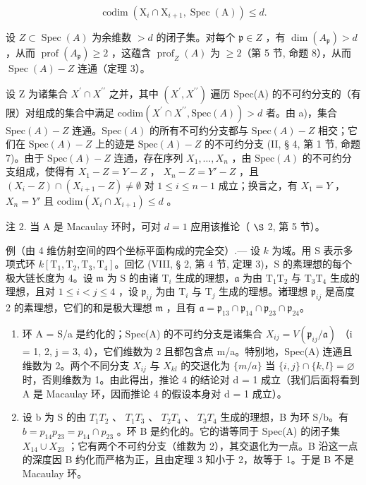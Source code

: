 \[
\operatorname{codim} \left(\mathrm{X} _ {i} \cap \mathrm{X} _ {i + 1}, \operatorname{Spec} (\mathrm{A})\right) \leqslant d.
\]

设 \(Z \subset \operatorname{Spec}(A)\) 为余维数 \(>d\) 的闭子集。对每个 \(\mathfrak{p} \in Z\) ，有 \(\dim(A_{\mathfrak{p}}) > d\) ，从而 \(\operatorname{prof}(A_{\mathfrak{p}}) \geqslant 2\) ，这蕴含 \(\operatorname{prof}_{Z}(A)\) 为 \(\geqslant 2\)（第 5 节, 命题 8），从而 \(\operatorname{Spec}(A) - Z\) 连通（定理 3）。

设 Z 为诸集合 \(X^{\prime} \cap X^{\prime\prime}\) 之并，其中 \((X^{\prime}, X^{\prime\prime})\) 遍历 Spec(A) 的不可约分支的（有限）对组成的集合中满足 \(\text{codim}(X^{\prime} \cap X^{\prime\prime}, \text{Spec}(A)) > d\) 者。由 a)，集合 \(\text{Spec}(A) - Z\) 连通。\(\text{Spec}(A)\) 的所有不可约分支都与 \(\text{Spec}(A) - Z\) 相交；它们在 \(\text{Spec}(A) - Z\) 上的迹是 \(\text{Spec}(A) - Z\) 的不可约分支 (II, § 4, 第 1 节, 命题 7)。由于 \(\text{Spec}(A) - Z\) 连通，存在序列 \(X_{1}, \ldots, X_{n}\) ，由 \(\text{Spec}(A)\) 的不可约分支组成，使得有 \(X_{1} - Z = Y - Z\) ， \(X_{n} - Z = Y' - Z\) ，且 \((X_{i} - Z) \cap (X_{i+1} - Z) \neq \emptyset\) 对 \(1 \leqslant i \leqslant n - 1\) 成立；换言之，有 \(X_{1} = Y\) ， \(X_{n} = Y'\) 且 \(\text{codim}(X_{i} \cap X_{i+1}) \leqslant d\) 。

注 2. 当 A 是 Macaulay 环时，可对 \(d=1\) 应用该推论（ \(\S\) 2, 第 5 节）。

例（由 4 维仿射空间的四个坐标平面构成的完全交）.--- 设 \(k\) 为域。用 S 表示多项式环 \(k[\mathrm{T}_{1},\mathrm{T}_{2},\mathrm{T}_{3},\mathrm{T}_{4}]\)。回忆 (VIII, § 2, 第 4 节, 定理 3)，S 的素理想的每个极大链长度为 4。设 \(\mathfrak{m}\) 为 S 的由诸 \(\mathrm{T}_{i}\) 生成的理想，\(\mathfrak{a}\) 为由 \(\mathrm{T}_{1}\mathrm{T}_{2}\) 与 \(\mathrm{T}_{3}\mathrm{T}_{4}\) 生成的理想，且对 \(1 \leqslant i < j \leqslant 4\) ，设 \(\mathfrak{p}_{ij}\) 为由 \(\mathrm{T}_{i}\) 与 \(\mathrm{T}_{j}\) 生成的理想。诸理想 \(\mathfrak{p}_{ij}\) 是高度 2 的素理想，它们的和是极大理想 \(\mathfrak{m}\) ，且有 \(\mathfrak{a} = \mathfrak{p}_{13} \cap \mathfrak{p}_{14} \cap \mathfrak{p}_{23} \cap \mathfrak{p}_{24}\)。

\begin{enumerate}
\def\labelenumi{\alph{enumi})}
\item
  环 A = S/a 是约化的；Spec(A) 的不可约分支是诸集合 \(X_{ij} = V(\mathfrak{p}_{ij}/\mathfrak{a})\) （i = 1, 2, j = 3, 4），它们维数为 2 且都包含点 m/a。特别地，Spec(A) 连通且维数为 2。两个不同分支 \(X_{ij}\) 与 \(X_{kl}\) 的交退化为 \(\{m/a\}\) 当 \(\{i,j\} \cap \{k,l\} = \varnothing\) 时，否则维数为 1。由此得出，推论 4 的结论对 d = 1 成立（我们后面将看到 A 是 Macaulay 环，因而推论 4 的假设本身对 d = 1 成立）。
\item
  设 b 为 S 的由 \(T_{1}T_{2}\) 、 \(T_{1}T_{3}\) 、 \(T_{2}T_{4}\) 、 \(T_{3}T_{4}\) 生成的理想，B 为环 S/b。有 \(b = p_{14}p_{23} = p_{14} \cap p_{23}\) 。环 B 是约化的。它的谱等同于 Spec(A) 的闭子集 \(X_{14} \cup X_{23}\) ；它有两个不可约分支（维数为 2），其交退化为一点。B 沿这一点的深度因 B 约化而严格为正，且由定理 3 知小于 2，故等于 1。于是 B 不是 Macaulay 环。
\end{enumerate}


